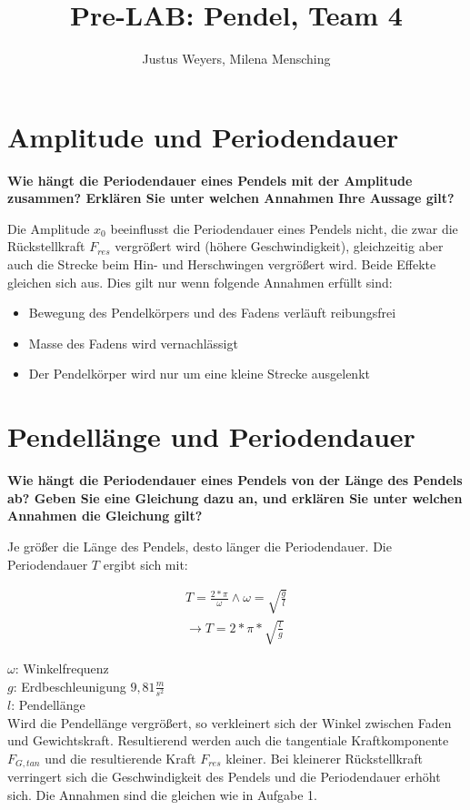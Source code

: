 \documentclass[a4paper, 12pt]{article}
\title{Pre-LAB: Pendel, Team 4}
\author{Justus Weyers, Milena Mensching}
\begin{document}
\maketitle
\section{Amplitude und Periodendauer}
\textbf{Wie hängt die Periodendauer eines Pendels mit der Amplitude zusammen? Erklären Sie
unter welchen Annahmen Ihre Aussage gilt?}

Die Amplitude $x_0$ beeinflusst die Periodendauer eines Pendels nicht, die zwar die Rückstellkraft $F_{res}$ vergrößert wird (höhere Geschwindigkeit), gleichzeitig aber auch die Strecke beim Hin- und Herschwingen vergrößert wird. Beide Effekte gleichen sich aus. Dies gilt nur wenn folgende Annahmen erfüllt sind:
\begin{itemize}
\item{Bewegung des Pendelkörpers und des Fadens verläuft reibungsfrei}
\item{Masse des Fadens wird vernachlässigt}
\item{Der Pendelkörper wird nur um eine kleine Strecke ausgelenkt}
\end{itemize}  

\section{Pendellänge und Periodendauer}
\textbf{Wie hängt die Periodendauer eines Pendels von der Länge des Pendels ab? Geben Sie
eine Gleichung dazu an, und erklären Sie unter welchen Annahmen die Gleichung gilt?}

Je größer die Länge des Pendels, desto länger die Periodendauer. Die Periodendauer $T$ ergibt sich mit:

\begin{equation*}
\begin{split}
T=\frac{2*\pi}{\omega} \land \omega = \sqrt{\frac{g}{l}}\\
\rightarrow T=2*\pi*\sqrt{\frac{l}{g}}
\end{split} 
\end{equation*}

\noindent $\omega$: Winkelfrequenz\\
\noindent $g$: Erdbeschleunigung $9,81\frac{m}{s^2}$\\
\noindent $l$: Pendellänge\\

Wird die Pendellänge vergrößert, so verkleinert sich der Winkel zwischen Faden und Gewichtskraft. Resultierend werden auch die tangentiale Kraftkomponente $F_{G,tan}$ und die resultierende Kraft $F_{res}$ kleiner. Bei kleinerer Rückstellkraft verringert sich die Geschwindigkeit des Pendels und die Periodendauer erhöht sich. Die Annahmen sind die gleichen wie in Aufgabe 1. 
\end{document}
